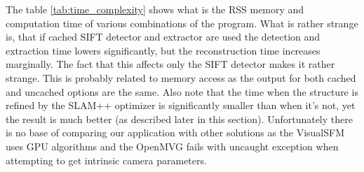 The table \ref{tab:time_complexity} shows what is the RSS memory and computation time of various combinations of the program. What is rather strange is, that if cached SIFT detector and extractor are used the detection and extraction time lowers significantly, but the reconstruction time increases marginally. The fact that this affects only the SIFT detector makes it rather strange. This is probably related to memory access as the output for both cached and uncached options are the same. Also note that the time when the structure is refined by the SLAM++ optimizer is significantly smaller than when it's not, yet the result is much better (as described later in this section). Unfortunately there is no base of comparing our application with other solutions as the VisualSFM uses GPU algorithms and the OpenMVG fails with uncaught exception when attempting to get intrinsic camera parameters.

